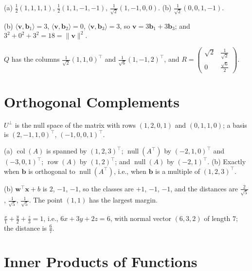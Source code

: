 \documentclass[11pt]{article}
\newcommand{\norm}[1]{\lVert #1 \rVert}
\newcommand{\ip}[2]{\langle #1, #2 \rangle}
\DeclareMathOperator{\Null}{null}
\DeclareMathOperator{\col}{col}
\DeclareMathOperator{\row}{row}
\begin{document}
\begin{description}[leftmargin=0pt, itemsep=0.3em]
    \item[\ref{pr:gs-haar}.] (a) $\frac{1}{2}(1, 1, 1, 1)$, $\frac{1}{2}(1, 1, -1, -1)$, $\frac{1}{\sqrt{2}}(1, -1, 0, 0)$. (b) $\frac{1}{\sqrt{2}}(0, 0, 1, -1)$.
    \item[\ref{pr:onb-coords}.] (b) $\ip{\mathbf{v}}{\mathbf{b}_1} = 3$, $\ip{\mathbf{v}}{\mathbf{b}_2} = 0$, $\ip{\mathbf{v}}{\mathbf{b}_3} = 3$, so $\mathbf{v} = 3\mathbf{b}_1 + 3\mathbf{b}_3$; and $3^2 + 0^2 + 3^2 = 18 = \norm{\mathbf{v}}^2$.
    \item[\ref{pr:qr}.] $Q$ has the columns $\frac{1}{\sqrt{2}}(1, 1, 0)^\top$ and $\frac{1}{\sqrt{6}}(1, -1, 2)^\top$, and $R = \begin{pmatrix} \sqrt{2} & \frac{1}{\sqrt{2}} \\ 0 & \frac{\sqrt{6}}{2} \end{pmatrix}$.
\end{description}

\section*{Orthogonal Complements}

\begin{description}[leftmargin=0pt, itemsep=0.3em]
    \item[\ref{pr:complement}.] $U^\perp$ is the null space of the matrix with rows $(1, 2, 0, 1)$ and $(0, 1, 1, 0)$; a basis is $(2, -1, 1, 0)^\top$, $(-1, 0, 0, 1)^\top$.
    \item[\ref{pr:four-subspaces}.] (a) $\col(A)$ is spanned by $(1, 2, 3)^\top$; $\Null(A^\top)$ by $(-2, 1, 0)^\top$ and $(-3, 0, 1)^\top$; $\row(A)$ by $(1, 2)^\top$; and $\Null(A)$ by $(-2, 1)^\top$. (b) Exactly when $\mathbf{b}$ is orthogonal to $\Null(A^\top)$, i.e., when $\mathbf{b}$ is a multiple of $(1, 2, 3)^\top$.
    \item[\ref{pr:classifier}.] (b) $\mathbf{w}^\top \mathbf{x} + b$ is $2$, $-1$, $-1$, so the classes are $+1$, $-1$, $-1$, and the distances are $\frac{2}{\sqrt{5}}$, $\frac{1}{\sqrt{5}}$, $\frac{1}{\sqrt{5}}$. The point $(1, 1)$ has the largest margin.
    \item[\ref{pr:hyperplane-form}.] $\frac{x}{1} + \frac{y}{2} + \frac{z}{3} = 1$, i.e., $6x + 3y + 2z = 6$, with normal vector $(6, 3, 2)$ of length $7$; the distance is $\frac{6}{7}$.
\end{description}

\section*{Inner Products of Functions}
\end{document}
